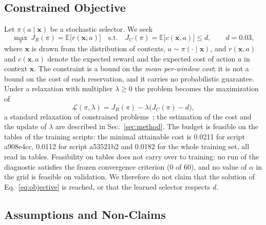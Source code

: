 \subsection{Constrained Objective}
\label{sec:objective}

Let $\pi(a\mid\mathbf{x})$ be a stochastic selector.%
We seek
\begin{equation}
  \max_{\pi}\ J_R(\pi)=\mathbb{E}\bigl[r(\mathbf{x},a)\bigr]
  \quad\text{s.t.}\quad
  J_C(\pi)=\mathbb{E}\bigl[c(\mathbf{x},a)\bigr]\le d,\qquad d=0.03,
  \label{eq:objective}
\end{equation}%
where $\mathbf{x}$ is drawn from the distribution of contexts, $a\sim\pi(\cdot\mid\mathbf{x})$, and $r(\mathbf{x},a)$ and $c(\mathbf{x},a)$ denote the expected reward and the expected cost of action $a$ in context $\mathbf{x}$.%
The constraint is a bound on the \emph{mean per-window cost}; it is not a bound on the cost of each reservation, and it carries no probabilistic guarantee.%
Under a relaxation with multiplier $\lambda\ge0$ the problem becomes the maximization of
\begin{equation}
  \mathcal{L}(\pi,\lambda)=J_R(\pi)-\lambda\bigl(J_C(\pi)-d\bigr),
  \label{eq:lagrangian}
\end{equation}%
a standard relaxation of constrained problems~\cite{TODO-lagrangian-relaxation}; the estimation of the cost and the update of $\lambda$ are described in Sec.~\ref{sec:method}.%
The budget is feasible on the tables of the training scripts: the minimal attainable cost is 0.0211 for script a908e4cc, 0.0112 for script a53521b2 and 0.0182 for the whole training set, all read in tables.%
Feasibility on tables does not carry over to training: no run of the diagnostic satisfies the frozen convergence criterion (0 of 60), and no value of $\alpha$ in the grid is feasible on validation.%
We therefore do not claim that the solution of Eq.~\eqref{eq:objective} is reached, or that the learned selector respects $d$.%

\subsection{Assumptions and Non-Claims}
\label{sec:assumptions}

